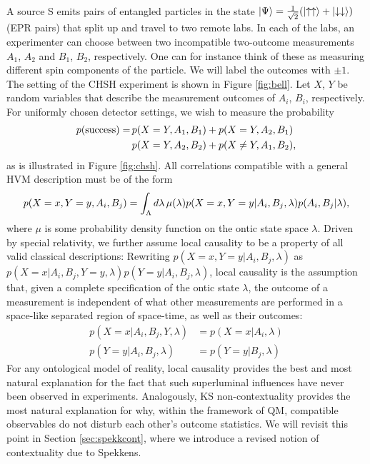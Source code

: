 A source S emits pairs of entangled particles in the state $\left|\Psi\right\rangle =\frac{1}{\sqrt{2}}(\ket{\uparrow\uparrow} +\ket{\downarrow\downarrow})$ (EPR pairs) that split up and travel to two remote labs. In each of the labs, an experimenter can choose between two incompatible two-outcome measurements $A_{1}$, $A_{2}$ and $B_{1}$, $B_{2}$, respectively. One can for instance think of these as measuring different spin components of the particle. We will label the outcomes with $\pm1$. The setting of the CHSH experiment is shown in Figure \ref{fig:bell}. Let $X$, $Y$ be random variables that describe the measurement outcomes of $A_i$, $B_i$, respectively. For uniformly chosen detector settings, we wish to measure the probability
\begin{equation*}
\begin{split}
p(\text{{success}}) =\thinspace & p(X=Y,A_1,B_1)+p(X=Y,A_2,B_1) \\
& p(X=Y,A_2,B_2)+p(X\neq Y,A_1,B_2),
\end{split}
\end{equation*}
as is illustrated in Figure \ref{fig:chsh}.
All correlations compatible with a general HVM description must be of the form
\begin{equation*}
p(X=x,Y=y,A_i,B_j)=\int_{\Lambda}d\lambda\thinspace\mu(\lambda)p(X=x,Y=y\vert A_i,B_j,\lambda)p(A_i,B_j\vert \lambda),
\end{equation*}
where $\mu$ is some probability density function on the ontic state space $\lambda$.
Driven by special relativity, we further assume local causality to be a property of all valid classical descriptions: Rewriting $p(X=x,Y=y \vert A_i,B_j,\lambda)$ as $p(X=x\vert A_i, B_j, Y=y, \lambda)p(Y=y\vert A_i,B_j,\lambda)$, local causality is the assumption that, given a complete specification of the ontic state $\lambda$, the outcome of a measurement is independent of what other measurements are performed in a space-like separated region of space-time, as well as their outcomes:
\begin{align*}
    p(X=x\vert A_i,B_j,Y,\lambda) & =p(X=x\vert A_i,\lambda) \\
    p(Y=y\vert A_i,B_j,\lambda) & =p(Y=y\vert B_j,\lambda)
\end{align*}
For any ontological model of reality, local causality provides the best and most natural explanation for the fact that such superluminal influences have never been observed in experiments. Analogously, KS non-contextuality provides the most natural explanation for why, within the framework of QM, compatible observables do not disturb each other's outcome statistics. We will revisit this point in Section \ref{sec:spekkcont}, where we introduce a revised notion of contextuality due to Spekkens.
